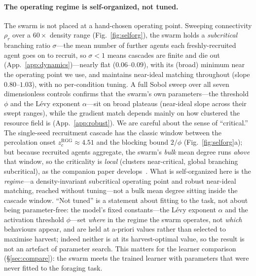 \documentclass{article}
\begin{document}
\paragraph{The operating regime is self-organized, not tuned.} The swarm is not placed at a hand-chosen
operating point. Sweeping connectivity $\rho_r$ over a $60\times$ density range (Fig.~\ref{fig:selforg}), the
swarm holds a \emph{subcritical} branching ratio $\sigma$---the mean number of further agents each
freshly-recruited agent goes on to recruit, so $\sigma<1$ means cascades are finite and die out
(App.~\ref{app:dynamics})---nearly flat ($0.06$--$0.09$), with its (broad) minimum near the operating point we
use, and maintains near-ideal matching throughout (slope $0.80$--$1.03$),
with no per-condition tuning. A full Sobol sweep over all seven dimensionless controls confirms that the swarm's
own parameters---the threshold $\phi$ and the L\'evy exponent $\alpha$---sit on broad plateaus (near-ideal slope
across their swept ranges), while the gradient match depends mainly on how clustered the resource field is
(App.~\ref{app:robust}). We are careful about the sense of ``critical.'' The single-seed recruitment
cascade has the classic window between the percolation onset $z_c^{\mathrm{RGG}}\approx4.51$ and the blocking
bound $2/\phi$ (Fig.~\ref{fig:selforg}a); but because recruited agents aggregate, the swarm's \emph{bulk} mean
degree runs \emph{above} that window, so the criticality is \emph{local} (clusters near-critical, global
branching subcritical), as the companion paper develops~\citep{partI}. What is self-organized here is the
\emph{regime}---a density-invariant subcritical operating point and robust near-ideal matching, reached without
tuning---not a bulk mean degree sitting inside the cascade window. ``Not tuned'' is a statement about fitting to
the task, not about being parameter-free: the model's fixed constants---the L\'evy exponent $\alpha$ and the
activation threshold $\phi$---set \emph{where} in the regime the swarm operates, not \emph{which} behaviours
appear, and are held at a-priori values rather than selected to maximise harvest; indeed neither is at its
harvest-optimal value, so the result is not an artefact of parameter search. This matters for the learner
comparison (\S\ref{sec:compare}): the swarm meets the trained learner with parameters that were never fitted to
the foraging task.
\end{document}
